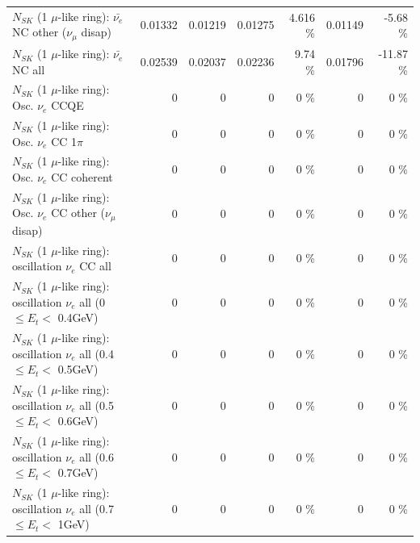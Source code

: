 \begin{table}
\begin{tabular}{| l | r | r | r  r | r  r |}
          $N_{SK}$ (1 $\mu$-like ring): $\bar{\nu_e}$ NC other ($\nu_\mu$ disap) &         0.01332 &         0.01219 &         0.01275 &    4.616 \%  &         0.01149 &    -5.68 \%  \\ 
                            $N_{SK}$ (1 $\mu$-like ring): $\bar{\nu_{e}}$ NC all &         0.02539 &         0.02037 &         0.02236 &     9.74 \%  &         0.01796 &   -11.87 \%  \\ 
\hline
\hline
\hline
                                 $N_{SK}$ (1 $\mu$-like ring): Osc. $\nu_e$ CCQE &               0 &               0 &               0 &        0 \%  &               0 &        0 \%  \\ 
                            $N_{SK}$ (1 $\mu$-like ring): Osc. $\nu_e$ CC 1$\pi$ &               0 &               0 &               0 &        0 \%  &               0 &        0 \%  \\ 
                          $N_{SK}$ (1 $\mu$-like ring): Osc. $\nu_e$ CC coherent &               0 &               0 &               0 &        0 \%  &               0 &        0 \%  \\ 
           $N_{SK}$ (1 $\mu$-like ring): Osc. $\nu_e$ CC other ($\nu_\mu$ disap) &               0 &               0 &               0 &        0 \%  &               0 &        0 \%  \\ 
                        $N_{SK}$ (1 $\mu$-like ring): oscillation $\nu_e$ CC all &               0 &               0 &               0 &        0 \%  &               0 &        0 \%  \\ 
\hline
$N_{SK}$ (1 $\mu$-like ring): oscillation $\nu_{e}$ all (0 $\leq E_{t} <$ 0.4GeV) &               0 &               0 &               0 &        0 \%  &               0 &        0 \%  \\ 
$N_{SK}$ (1 $\mu$-like ring): oscillation $\nu_{e}$ all (0.4 $\leq E_{t} <$ 0.5GeV) &               0 &               0 &               0 &        0 \%  &               0 &        0 \%  \\ 
$N_{SK}$ (1 $\mu$-like ring): oscillation $\nu_{e}$ all (0.5 $\leq E_{t} <$ 0.6GeV) &               0 &               0 &               0 &        0 \%  &               0 &        0 \%  \\ 
$N_{SK}$ (1 $\mu$-like ring): oscillation $\nu_{e}$ all (0.6 $\leq E_{t} <$ 0.7GeV) &               0 &               0 &               0 &        0 \%  &               0 &        0 \%  \\ 
$N_{SK}$ (1 $\mu$-like ring): oscillation $\nu_{e}$ all (0.7 $\leq E_{t} <$ 1GeV) &               0 &               0 &               0 &        0 \%  &               0 &        0 \%  \\ 

\end{tabular}
\end{table}
